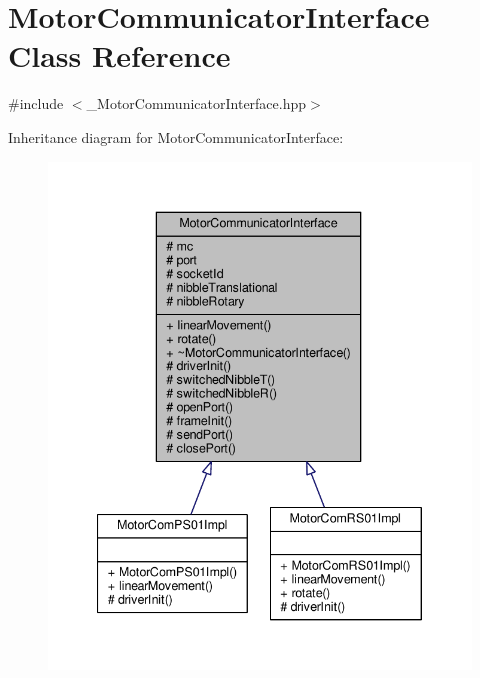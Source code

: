 \hypertarget{class_motor_communicator_interface}{}\section{Motor\+Communicator\+Interface Class Reference}
\label{class_motor_communicator_interface}


{\ttfamily \#include $<$\+\_\+\+Motor\+Communicator\+Interface.\+hpp$>$}



Inheritance diagram for Motor\+Communicator\+Interface\+:\nopagebreak
\begin{figure}[H]
\begin{center}
\leavevmode
\includegraphics[width=340pt]{class_motor_communicator_interface__inherit__graph}
\end{center}
\end{figure}


